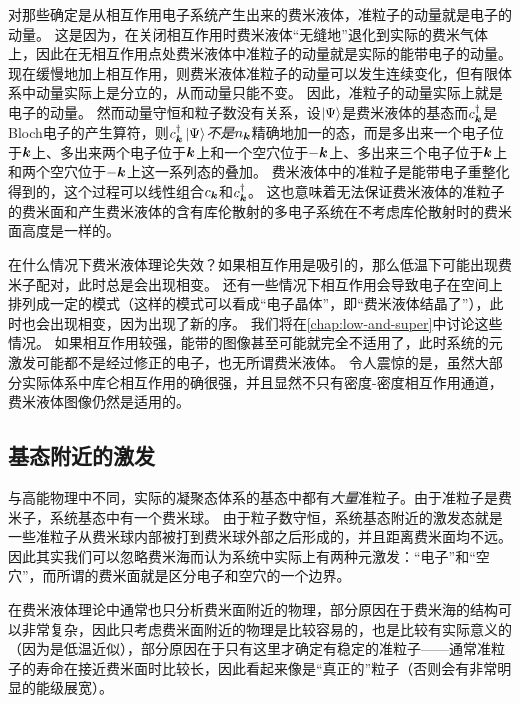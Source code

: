 对那些确定是从相互作用电子系统产生出来的费米液体，准粒子的动量就是电子的动量。
这是因为，在关闭相互作用时费米液体“无缝地”退化到实际的费米气体上，因此在无相互作用点处费米液体中准粒子的动量就是实际的能带电子的动量。
现在缓慢地加上相互作用，则费米液体准粒子的动量可以发生连续变化，但有限体系中动量实际上是分立的，从而动量只能不变。
因此，准粒子的动量实际上就是电子的动量。
然而动量守恒和粒子数没有关系，设$\ket{\Psi}$是费米液体的基态而$c^\dagger_{\vb*{k}}$是Bloch电子的产生算符，则$c^\dagger_{\vb*{k}} \ket{\Psi}$\emph{不是}$n_{\vb*{k}}$精确地加一的态，而是多出来一个电子位于$\vb*{k}$上、多出来两个电子位于$\vb*{k}$上和一个空穴位于$-\vb*{k}$上、多出来三个电子位于$\vb*{k}$上和两个空穴位于$-\vb*{k}$上这一系列态的叠加。
费米液体中的准粒子是能带电子重整化得到的，这个过程可以线性组合$c_{\vb*{k}}$和$c^\dagger_{\vb*{k}}$。
这也意味着无法保证费米液体的准粒子的费米面和产生费米液体的含有库伦散射的多电子系统在不考虑库伦散射时的费米面高度是一样的。

在什么情况下费米液体理论失效？如果相互作用是吸引的，那么低温下可能出现费米子配对，此时总是会出现相变。
还有一些情况下相互作用会导致电子在空间上排列成一定的模式（这样的模式可以看成“电子晶体”，即“费米液体结晶了”），此时也会出现相变，因为出现了新的序。
我们将在\autoref{chap:low-and-super}中讨论这些情况。
如果相互作用较强，能带的图像甚至可能就完全不适用了，此时系统的元激发可能都不是经过修正的电子，也无所谓费米液体。
令人震惊的是，虽然大部分实际体系中库仑相互作用的确很强，并且显然不只有密度-密度相互作用通道，费米液体图像仍然是适用的。

\subsection{基态附近的激发}\label{sec:fermi-liquid-ground}

与高能物理中不同，实际的凝聚态体系的基态中都有\emph{大量}准粒子。由于准粒子是费米子，系统基态中有一个费米球。
由于粒子数守恒，系统基态附近的激发态就是一些准粒子从费米球内部被打到费米球外部之后形成的，并且距离费米面均不远。
因此其实我们可以忽略费米海而认为系统中实际上有两种元激发：“电子”和“空穴”，而所谓的费米面就是区分电子和空穴的一个边界。

在费米液体理论中通常也只分析费米面附近的物理，部分原因在于费米海的结构可以非常复杂，因此只考虑费米面附近的物理是比较容易的，也是比较有实际意义的（因为是低温近似），部分原因在于只有这里才确定有稳定的准粒子——通常准粒子的寿命在接近费米面时比较长，因此看起来像是“真正的”粒子（否则会有非常明显的能级展宽）。

